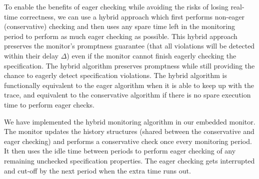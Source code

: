 To enable the benefits of eager checking while avoiding the risks of losing real-time correctness, we can use a hybrid approach which first performs non-eager (conservative) checking and then uses any spare time left in the monitoring period to perform as much eager checking as possible.
This hybrid approach preserves the monitor's promptness guarantee (that all violations will be detected within their delay $\Delta$) even if the monitor cannot finish eagerly checking the specification. 
The hybrid algorithm preserves promptness while still providing the chance to eagerly detect specification violations. 
The hybrid algorithm is functionally equivalent to the eager algorithm when it is able to keep up with the trace, and equivalent to the conservative algorithm if there is no spare execution time to perform eager checks.
%
%



We have implemented the hybrid monitoring algorithm in our embedded monitor. The monitor updates the history structures (shared between the conservative and eager checking) and performs a conservative check once every monitoring period. It then uses the idle time between periods to perform eager checking of any remaining unchecked specification properties. The eager checking gets interrupted and cut-off by the next period when the extra time runs out.



